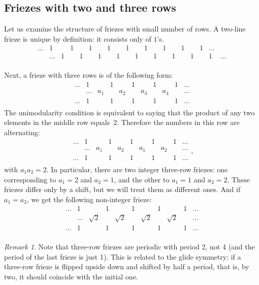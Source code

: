 \documentclass[a4paper,11pt]{amsart}
\theoremstyle{plain}
\theoremstyle{remark}
\newtheorem{remark}[theorem]{Remark}
\theoremstyle{definition}
\numberwithin{equation}{section}
\numberwithin{figure}{section}
\begin{document}
\subsection{Friezes with two and three rows}

Let us examine the structure of friezes with small number of rows. A two-line frieze is unique by definition: it consists only of $1$'s.
\[
\begin{array}{ccccccccccccccccccccc}
\dots &1 && 1&& 1&& 1&& 1&& 1&& 1&& 1&& 1 &\dots\\
&\dots &1 && 1&& 1&& 1&& 1&& 1&& 1&& 1&& 1 &\dots\\
\end{array}
\]

Next, a frieze with three rows is of the following form:
\[
\begin{array}{ccccccccccccccccccccc}
\dots &1 && 1&& 1&& 1&& 1&\dots\\
& \dots & a_1 && a_2&& a_3&& a_4&&\dots \\
\dots &1 && 1&& 1&& 1&& 1 &\dots\\
\end{array}
\]
The unimodularity condition is equivalent to saying that the product of any two elements in the middle row equals~2. Therefore the numbers in this row are alternating:
\[
\begin{array}{ccccccccccccccccccccc}
\dots &1 && 1&& 1&& 1&& 1&\dots\\
& \dots & a_1 && a_2&& a_1&& a_2&&\dots \\
\dots &1 && 1&& 1&& 1&& 1 &\dots\\
\end{array},
\]
with $a_1a_2=2$. In particular, there are two integer three-row friezes: one corresponding to $a_1=2$ and $a_2=1$, and the other to $a_1=1$ and $a_2=2$. These friezes differ only by a shift, but we will treat them as different ones. And if $a_1=a_2$, we get the following non-integer frieze:
\[
\begin{array}{ccccccccccccccccccccc}
\dots &1 && 1&& 1&& 1&& 1&\dots\\
& \dots & \sqrt{2} && \sqrt{2} && \sqrt{2} &&  \sqrt{2} &&\dots \\
\dots &1 && 1&& 1&& 1&& 1 &\dots\\
\end{array}
\]
\begin{remark}\label{rem:period}
Note that three-row friezes are periodic with period 2, not 4 (and the period of the last frieze is just 1). This is related to the glide symmetry: if a three-row frieze is flipped upside down and shifted by half a period, that is, by two, it should coincide with the initial one.
\end{remark}
\end{document}
